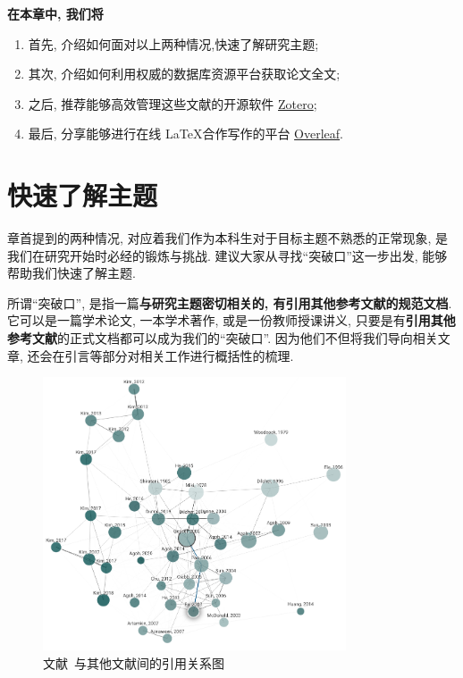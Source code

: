 \documentclass{formatBook}
\begin{document}
\textbf{在本章中, 我们将}
\begin{enumerate}
    \item 首先, 介绍如何面对以上两种情况,快速了解研究主题;
    \item 其次, 介绍如何利用权威的数据库资源平台获取论文全文;
    \item 之后, 推荐能够高效管理这些文献的开源软件 \href{https://www.zotero.org/}{Zotero};
    \item 最后, 分享能够进行在线 \LaTeX 合作写作的平台 \href{https://www.overleaf.com/}{Overleaf}.
\end{enumerate}

\section{快速了解主题}
章首提到的两种情况, 对应着我们作为本科生对于目标主题不熟悉的正常现象, 是我们在研究开始时必经的锻炼与挑战. 建议大家从寻找``突破口''这一步出发, 能够帮助我们快速了解主题.

所谓``突破口'', 是指一篇\textbf{与研究主题密切相关的, 有引用其他参考文献的规范文档}. 它可以是一篇学术论文, 一本学术著作, 或是一份教师授课讲义, 只要是有\textbf{引用其他参考文献}的正式文档都可以成为我们的``突破口''. 因为他们不但将我们导向相关文章, 还会在引言等部分对相关工作进行概括性的梳理.

\begin{figure}[H]
    \centering
    \includegraphics[width=0.8\textwidth]{figure/graph.png}
    \caption{文献~\cite{gessel_mikis_2005}与其他文献间的引用关系图}
    \label{fig:mikiGrapg}
\end{figure}
\end{document}

